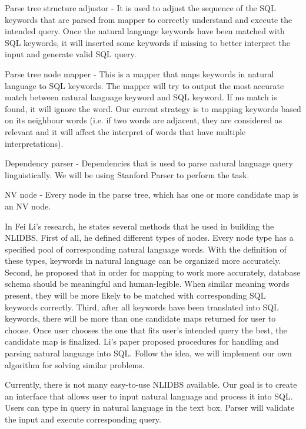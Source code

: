 \documentclass[twocolumn]{article}
\begin{document}
Parse tree structure adjustor - It is used to adjust the sequence of the SQL keywords that are parsed from mapper to correctly understand and execute the intended query.  Once the natural language keywords have been matched with SQL keywords, it will inserted some keywords if missing to better interpret the input and  generate valid SQL query.
      
Parse tree node mapper - This is a mapper that maps keywords in natural language to SQL keywords. The mapper will try to output the most accurate match between natural language keyword and SQL keyword. If no match is found, it will ignore the word. Our current strategy is to mapping keywords based on its neighbour words (i.e. if two words are adjacent, they are considered as relevant and it will affect the interpret of words that have multiple interpretations).
      
Dependency parser - Dependencies that is used to parse natural language query linguistically.  We will be using Stanford Parser to perform the task.
      
NV node - Every node in the parse tree, which has one or more candidate map is an NV node.
	
In Fei Li’s research, he states several methods that he used in building the NLIDBS. First of all, he defined different types of nodes. Every node type has a specified pool of corresponding natural language words. With the definition of these types, keywords in natural language can be organized more accurately. Second, he proposed that in order for mapping to work more accurately, database schema should be meaningful and human-legible. When similar meaning words present, they will be more likely to be matched with corresponding SQL keywords correctly. Third, after all keywords have been translated into SQL keywords, there will be more than one candidate maps returned for user to choose. Once user chooses the one that fits user’s intended query the best, the candidate map is finalized. Li’s paper proposed procedures for handling and parsing natural language into SQL.\cite{li2014} Follow the idea, we will implement our own algorithm for solving similar problems.

Currently, there is not many easy-to-use NLIDBS available. Our goal is to create an interface that allows user to input natural language and process it into SQL. Users can type in query in natural language in the text box. Parser will validate the input and execute corresponding query.


\end{document}
